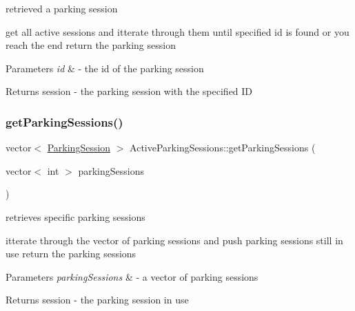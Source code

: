 retrieved a parking session 

get all active sessions and itterate through them until specified id is found or you reach the end return the parking session


\begin{DoxyParams}{Parameters}
{\em id} & -\/ the id of the parking session \\
\hline
\end{DoxyParams}
\begin{DoxyReturn}{Returns}
session -\/ the parking session with the specified ID 
\end{DoxyReturn}
\mbox{\label{class_active_parking_sessions_a6fd4dcdfd24dc941aff78a10f185a2ae}} 
\subsubsection{\texorpdfstring{get\+Parking\+Sessions()}{getParkingSessions()}}
{\footnotesize\ttfamily vector$<$ \mbox{\hyperlink{class_parking_session}{Parking\+Session}} $>$ Active\+Parking\+Sessions\+::get\+Parking\+Sessions (\begin{DoxyParamCaption}\item[{vector$<$ int $>$}]{parking\+Sessions }\end{DoxyParamCaption})}



retrieves specific parking sessions 

itterate through the vector of parking sessions and push parking sessions still in use return the parking sessions


\begin{DoxyParams}{Parameters}
{\em parking\+Sessions} & -\/ a vector of parking sessions \\
\hline
\end{DoxyParams}
\begin{DoxyReturn}{Returns}
session -\/ the parking session in use 
\end{DoxyReturn}
\mbox{\label{class_active_parking_sessions_a32bb2ec28e44b62ad96d9acb2295f9c3}} 
